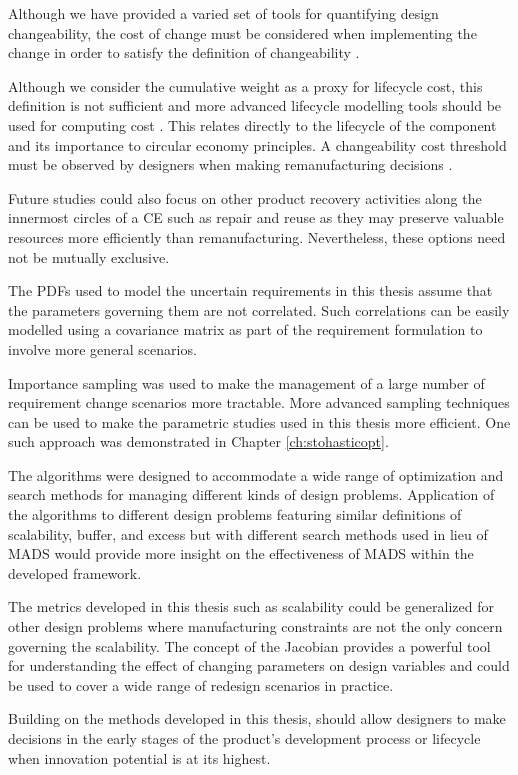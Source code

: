 Although we have provided a varied set of tools for quantifying design changeability, the cost of change must be considered when implementing the change in order to satisfy the definition of changeability \cite{Lawand2019}.

Although we consider the cumulative weight as a proxy for lifecycle cost, this definition is not sufficient and more advanced lifecycle modelling tools should be used for computing cost \cite{Lawand2019}. This relates directly to the lifecycle of the component and its importance to circular economy principles. A changeability cost threshold must be observed by designers when making remanufacturing decisions \cite{Ross2008}. 

Future studies could also focus on other product recovery activities along the innermost circles of a \ac{CE} such as repair and reuse as they may preserve valuable resources more efficiently than remanufacturing. Nevertheless, these options need not be mutually exclusive.

The \acp{PDF} used to model the uncertain requirements in this thesis assume that the parameters governing them are not correlated. Such correlations can be easily modelled using a covariance matrix as part of the requirement formulation to involve more general scenarios. 

Importance sampling was used to make the management of a large number of requirement change scenarios more tractable. More advanced sampling techniques can be used to make the parametric studies used in this thesis more efficient. One such approach was demonstrated in Chapter \ref{ch:stohasticopt}.

{\color{red} The algorithms were designed to accommodate a wide range of optimization and search methods for managing different kinds of design problems. Application of the algorithms to different design problems featuring similar definitions of scalability, buffer, and excess but with different search methods used in lieu of \ac{MADS} would provide more insight on the effectiveness of \ac{MADS} within the developed framework.

The metrics developed in this thesis such as scalability could be generalized for other design problems where manufacturing constraints are not the only concern governing the scalability. The concept of the Jacobian provides a powerful tool for understanding the effect of changing parameters on design variables and could be used to cover a wide range of redesign scenarios in practice.}

Building on the methods developed in this thesis, should allow designers to make decisions in the early stages of the product's development process or lifecycle when innovation potential is at its highest.